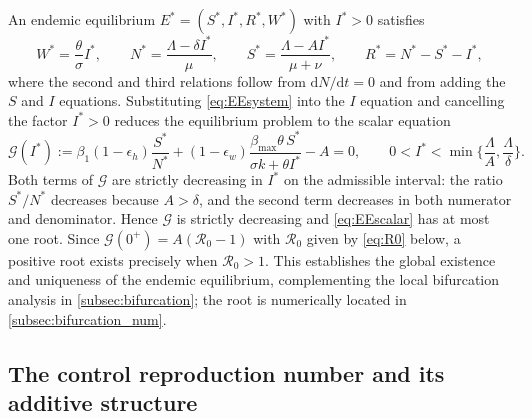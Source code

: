 \documentclass[11pt]{article}
\theoremstyle{plain}
\theoremstyle{definition}
\theoremstyle{remark}
\newcommand{\Rz}{\mathcal{R}_0}
\newcommand{\dd}{\mathrm{d}}
\begin{document}
An endemic equilibrium $E^*=(S^*,I^*,R^*,W^*)$ with $I^*>0$ satisfies
\begin{equation}\label{eq:EEsystem}
W^*=\frac{\theta}{\sigma}I^*,\qquad
N^*=\frac{\Lambda-\delta I^*}{\mu},\qquad
S^*=\frac{\Lambda-A I^*}{\mu+\nu},\qquad
R^*=N^*-S^*-I^*,
\end{equation}
where the second and third relations follow from $\dd N/\dd t=0$ and from adding the $S$ and $I$ equations. Substituting \eqref{eq:EEsystem} into the $I$ equation and cancelling the factor $I^*>0$ reduces the equilibrium problem to the scalar equation
\begin{equation}\label{eq:EEscalar}
\mathcal{G}(I^*):=\beta_1(1-\epsilon_h)\frac{S^*}{N^*}
+(1-\epsilon_w)\frac{\beta_{\max}\theta\,S^*}{\sigma k+\theta I^*}-A=0,
\qquad 0<I^*<\min\Big\{\frac{\Lambda}{A},\frac{\Lambda}{\delta}\Big\}.
\end{equation}
Both terms of $\mathcal{G}$ are strictly decreasing in $I^*$ on the admissible interval: the ratio $S^*/N^*$ decreases because $A>\delta$, and the second term decreases in both numerator and denominator. Hence $\mathcal{G}$ is strictly decreasing and \eqref{eq:EEscalar} has at most one root. Since $\mathcal{G}(0^+)=A(\Rz-1)$ with $\Rz$ given by \eqref{eq:R0} below, a positive root exists precisely when $\Rz>1$. This establishes the global existence and uniqueness of the endemic equilibrium, complementing the local bifurcation analysis in \cref{subsec:bifurcation}; the root is numerically located in \cref{subsec:bifurcation_num}.

\subsection{The control reproduction number and its additive structure}\label{subsec:R0}
\end{document}

